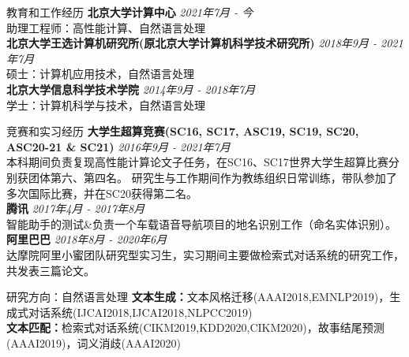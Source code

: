 \documentclass{resume} %
\begin{document}



\begin{rSection}{教育和工作经历}
    {\bf 北京大学计算中心} \hfill {\em 2021年7月 - 今~~~~~~~~~~~~~} 
    \\ 助理工程师：高性能计算、自然语言处理 \\
    {\bf 北京大学王选计算机研究所(原北京大学计算机科学技术研究所)} \hfill {\em 2018年9月 - 2021年7月} 
    \\ 硕士：计算机应用技术，自然语言处理 \\
    {\bf 北京大学信息科学技术学院} \hfill {\em 2014年9月 - 2018年7月}
    \\ 学士：计算机科学与技术，自然语言处理
\end{rSection}

\vspace{-0.2cm}
\begin{rSection}{竞赛和实习经历}
    \textbf{大学生超算竞赛(SC16, SC17, ASC19, SC19, SC20, ASC20-21 \& SC21)} \hfill {\em 2016年9月 - 2021年7月}\\
    本科期间负责复现高性能计算论文子任务，在SC16、SC17世界大学生超算比赛分别获团体第六、第四名。
    研究生与工作期间作为教练组织日常训练，带队参加了多次国际比赛，并在SC20获得第二名。 \\
    \textbf{腾讯} \hfill {\em 2017年4月 - 2017年8月} \\
    智能助手的测试\&负责一个车载语音导航项目的地名识别工作（命名实体识别）。\\
    \textbf{阿里巴巴} \hfill {\em 2018年8月 - 2020年6月}\\
    达摩院阿里小蜜团队研究型实习生，实习期间主要做检索式对话系统的研究工作，共发表三篇论文。
\end{rSection}

\vspace{-0.2cm}
\begin{rSection}{研究方向：自然语言处理}
    \textbf{文本生成：}文本风格迁移(AAAI2018,EMNLP2019)，生成式对话系统(IJCAI2018,IJCAI2018,NLPCC2019) \\
    \textbf{文本匹配：}检索式对话系统(CIKM2019,KDD2020,CIKM2020)，故事结尾预测(AAAI2019)，词义消歧(AAAI2020)
\end{rSection}
\end{document}
